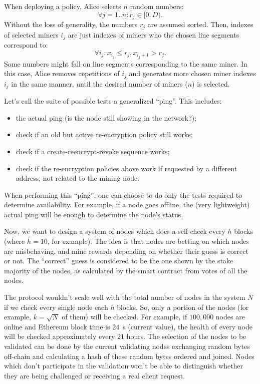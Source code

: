 \documentclass[longbibliography,nofootinbib]{revtex4-1}
\begin{document}
When deploying a policy, Alice selects $n$ random numbers:
\begin{equation}
    \forall j=1..n: r_j \in [0, D).
\end{equation}
Without the loss of generality, the numbers $r_j$ are assumed sorted.
Then, indexes of selected miners $i_j$ are just indexes of miners who the chosen line segments correspond to:
\begin{equation}
    \forall i_j: x_{i_j} \le r_j, x_{i_j + 1} > r_j.
\end{equation}
Some numbers might fall on line segments corresponding to the same miner.
In this case, Alice removes repetitions of $i_j$ and generates more chosen miner indexes $i_j$ in the same manner, until the desired number of miners ($n$) is
selected.

Let's call the suite of possible tests a generalized ``ping''.
This includes:
\begin{itemize}
    \item the actual ping (is the node still showing in the network?);
    \item check if an old but active re-encryption policy still works;
    \item check if a create-reencrypt-revoke sequence works;
    \item check if the re-encryption policies above work if requested by a different address, not related to the mining node.
\end{itemize}
When performing this ``ping'', one can choose to do only the tests required to determine availability.
For example, if a node goes offline, the (very lightweight) actual ping will be enough to determine the node's status.

Now, we want to design a system of nodes which does a self-check every $h$ blocks (where $h=10$, for example).
The idea is that nodes are betting on which nodes are misbehaving, and mine rewards depending on whether their guess is correct or not.
The ``correct'' guess is considered to be the one shown by the stake majority of the nodes, as calculated by the smart contract from votes of all the nodes.

The protocol wouldn't scale well with the total number of nodes in the system $N$ if we check every single node each $h$ blocks.
So, only a portion of the nodes (for example, $k=\sqrt{N}$ of them) will be checked.
For example, if $100,000$ nodes are online and Ethereum block time is $24$~s (current value), the health of every node will be checked approximately every $21$
hours.
The selection of the nodes to be validated can be done by the current validating nodes exchanging random bytes off-chain and calculating a hash of these
random bytes ordered and joined.
Nodes which don't participate in the validation won't be able to distinguish whether they are being challenged or receiving a real client request.
\end{document}
